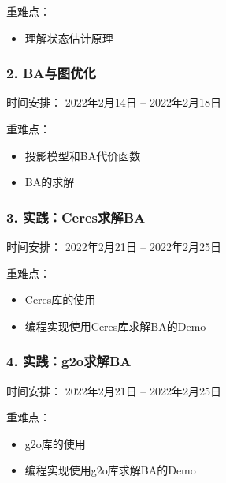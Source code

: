 \documentclass[letterpaper,10pt,english]{sphinxmanual}
\begin{document}
\sphinxAtStartPar
重难点：
\begin{itemize}
\item {} 
\sphinxAtStartPar
理解状态估计原理

\end{itemize}


\subsubsection{2. BA与图优化}
\label{\detokenize{ch9/ch9_u5b66_u4e60_u8ba1_u5212:ba}}
\sphinxAtStartPar
时间安排： 2022年2月14日 – 2022年2月18日

\sphinxAtStartPar
重难点：
\begin{itemize}
\item {} 
\sphinxAtStartPar
投影模型和BA代价函数

\item {} 
\sphinxAtStartPar
BA的求解

\end{itemize}


\subsubsection{3. 实践：Ceres求解BA}
\label{\detokenize{ch9/ch9_u5b66_u4e60_u8ba1_u5212:ceresba}}
\sphinxAtStartPar
时间安排： 2022年2月21日 – 2022年2月25日

\sphinxAtStartPar
重难点：
\begin{itemize}
\item {} 
\sphinxAtStartPar
Ceres库的使用

\item {} 
\sphinxAtStartPar
编程实现使用Ceres库求解BA的Demo

\end{itemize}


\subsubsection{4. 实践：g2o求解BA}
\label{\detokenize{ch9/ch9_u5b66_u4e60_u8ba1_u5212:g2oba}}
\sphinxAtStartPar
时间安排： 2022年2月21日 – 2022年2月25日

\sphinxAtStartPar
重难点：
\begin{itemize}
\item {} 
\sphinxAtStartPar
g2o库的使用

\item {} 
\sphinxAtStartPar
编程实现使用g2o库求解BA的Demo

\end{itemize}
\end{document}
